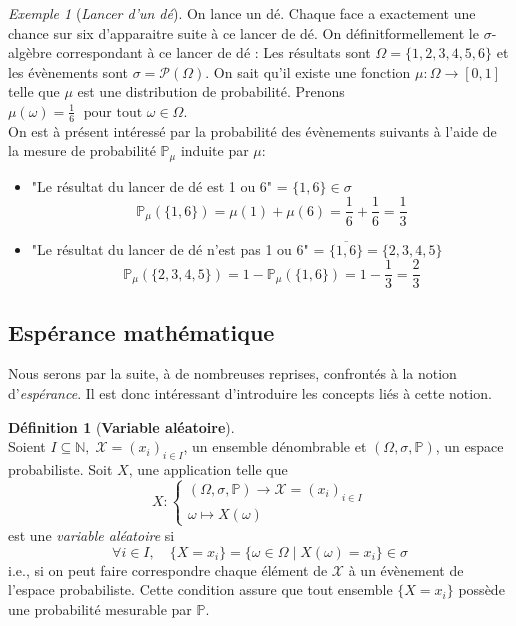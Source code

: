 \documentclass[12pt,a4paper]{report}
\theoremstyle{definition}%
\newtheorem{definition}{Définition}[chapter]
\theoremstyle{remark}
\newtheorem{example}{Exemple}[chapter]
\newcommand{\ie}{i.e., }
\newcommand{\pr}{\mathbb{P}}
\let\labelitemi\labelitemii
\begin{document}
\begin{example}[\textit{Lancer d'un dé}]\label{die}
	On lance un dé. Chaque face a exactement une chance sur six d'apparaitre suite à ce lancer de dé. On définitformellement le $\sigma$-algèbre correspondant à ce lancer de dé : 
	Les résultats sont $\Omega = \{1, 2, 3, 4, 5, 6\}$ et les évènements sont $\sigma = \mathcal{P}(\Omega)$.
	On sait qu'il existe une fonction $\mu: \Omega \rightarrow [0,1]$ telle que $\mu$ est une distribution de probabilité. Prenons $\mu(\omega) = \frac{1}{6} \; \text{ pour tout } \omega \in \Omega$.\\
	On est à présent intéressé par la probabilité des évènements suivants à l'aide de la mesure de probabilité $\pr_{\mu}$ induite par $\mu$:
	\begin{itemize}
		\renewcommand{\labelitemi}{\tiny$\bullet$}
		\item "Le résultat du lancer de dé est 1 ou 6" = $\{1, 6\} \in \sigma$
		\[\pr_{\mu}(\{1,6\}) = \mu(1) + \mu(6) = \frac{1}{6} + \frac{1}{6} = \frac{1}{3}\]
		\item "Le résultat du lancer de dé n'est pas 1 ou 6" = $\overline{\{1, 6\}} = \{2, 3, 4, 5\}$
		\[\pr_{\mu}(\{2, 3, 4, 5\}) = 1 - \pr_{\mu}(\{1, 6\}) = 1 - \frac{1}{3} = \frac{2}{3}\]
	\end{itemize}
\end{example}

\subsection*{Espérance mathématique}
Nous serons par la suite, à de nombreuses reprises, confrontés à la notion d'\textit{espérance}. Il est donc intéressant d'introduire les concepts liés à cette notion.

\begin{definition}[\textbf{Variable aléatoire}]~\cite{Course2} \\
	Soient $I \subseteq \mathbb{N}, \; \mathcal X = (x_i)_{i \in I}$, un ensemble dénombrable et $(\Omega, \sigma, \pr)$, un espace probabiliste. Soit $X$, une application telle que
	\[X :
	\begin{cases}
	(\Omega, \sigma, \pr) \rightarrow \mathcal{X} = (x_i)_{i \in I} \\
	\omega \mapsto X(\omega)
	\end{cases}
	\]
	est une \textit{variable aléatoire} si 
	\[\forall i \in I, \quad \{X = x_i\} = \{\omega \in \Omega \; | \; X(\omega) = x_i \} \in \sigma\]
	\ie si on peut faire correspondre chaque élément de $\mathcal{X}$  à un évènement de l'espace probabiliste. Cette condition assure que tout ensemble $\{X = x_i\}$ possède une probabilité mesurable par $\pr$.
\end{definition}
\end{document}
